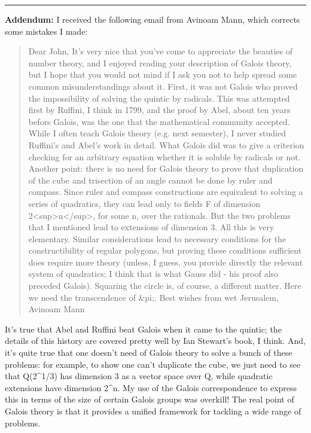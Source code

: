 \par\noindent\rule{\textwidth}{0.4pt}
\textbf{Addendum:} I received the following email from Avinoam Mann,
which corrects some mistakes I made:

\begin{quote}
Dear John,
It's very nice that you've come to appreciate the beauties of number
theory, and I enjoyed reading your description of Galois theory, but
I hope that you would not mind if I ask you not to help spread some common
misunderstandings about it. First, it was not Galois who proved the
impossibility of solving the quintic by radicals. This was attempted
first by Ruffini, I think in 1799, and the proof by Abel, about ten years
befors Galois, was the one that the mathematical community accepted.
While I often teach Galois theory (e.g. next semester), I never studied
Ruffini's and Abel's work in detail. What Galois did was to give a
criterion checking for an arbitrary equation whether it is soluble by
radicals or not.
Another point: there is no need for Galois theory to prove that
duplication of the cube and trisection of an angle cannot be done by
ruler and compass. Since ruler and compass constructions are equivalent
to solving a series of quadratics, they can lead only to fields F of
dimension 2<sup>n</sup>, for some n, over the rationals. But 
the two problems that
I mentioned lead to extensions of dimension 3. All this is very
elementary. Similar considerations lead to necessary conditions for the
constructibility of regular polygons, but proving these conditions
sufficient does require more theory (unless, I guess, you provide
directly the relevant system of quadratics; I think that is what Gauss
did - his proof also preceded Galois). Squaring the circle is, of course,
a different matter. Here we need the transcendence of &pi;.
Best wishes from wet Jerusalem,
Avinoam Mann
\end{quote}
    

It's true that Abel and Ruffini beat Galois when it came to the quintic; 
the details of this history are covered pretty well by Ian Stewart's book, 
I think.
And, it's quite true that one doesn't need of Galois theory to solve
a bunch of these problems: for example, to show one can't duplicate
the cube, we just need to see that Q(2^{1/3}) has dimension 3
as a vector space over Q, while quadratic extensions have dimension 
2^{n}.   My use of the Galois correspondence to express this in
terms of the size of certain Galois groups was overkill!  The real point of
Galois theory is that it provides a unified framework for tackling a wide
range of problems.  


